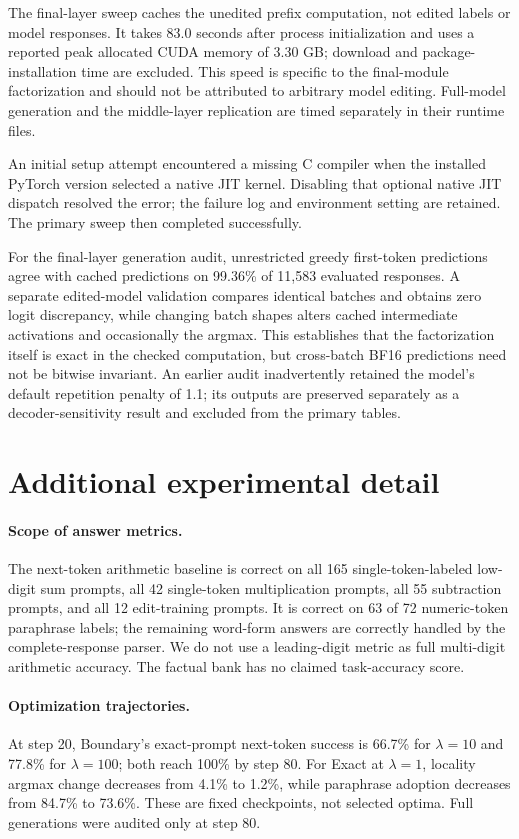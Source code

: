 \documentclass[10pt,twocolumn]{article}
\begin{document}
The final-layer sweep caches the unedited prefix computation, not edited labels or model responses. It takes 83.0 seconds after process initialization and uses a reported peak allocated CUDA memory of 3.30 GB; download and package-installation time are excluded. This speed is specific to the final-module factorization and should not be attributed to arbitrary model editing. Full-model generation and the middle-layer replication are timed separately in their runtime files.

An initial setup attempt encountered a missing C compiler when the installed PyTorch version selected a native JIT kernel. Disabling that optional native JIT dispatch resolved the error; the failure log and environment setting are retained. The primary sweep then completed successfully.

For the final-layer generation audit, unrestricted greedy first-token predictions agree with cached predictions on 99.36\% of 11,583 evaluated responses. A separate edited-model validation compares identical batches and obtains zero logit discrepancy, while changing batch shapes alters cached intermediate activations and occasionally the argmax. This establishes that the factorization itself is exact in the checked computation, but cross-batch BF16 predictions need not be bitwise invariant. An earlier audit inadvertently retained the model's default repetition penalty of 1.1; its outputs are preserved separately as a decoder-sensitivity result and excluded from the primary tables.

\section{Additional experimental detail}
\paragraph{Scope of answer metrics.}
The next-token arithmetic baseline is correct on all 165 single-token-labeled low-digit sum prompts, all 42 single-token multiplication prompts, all 55 subtraction prompts, and all 12 edit-training prompts. It is correct on 63 of 72 numeric-token paraphrase labels; the remaining word-form answers are correctly handled by the complete-response parser. We do not use a leading-digit metric as full multi-digit arithmetic accuracy. The factual bank has no claimed task-accuracy score.

\paragraph{Optimization trajectories.}
At step 20, Boundary's exact-prompt next-token success is 66.7\% for $\lambda=10$ and 77.8\% for $\lambda=100$; both reach 100\% by step 80. For Exact at $\lambda=1$, locality argmax change decreases from 4.1\% to 1.2\%, while paraphrase adoption decreases from 84.7\% to 73.6\%. These are fixed checkpoints, not selected optima. Full generations were audited only at step 80.
\end{document}

